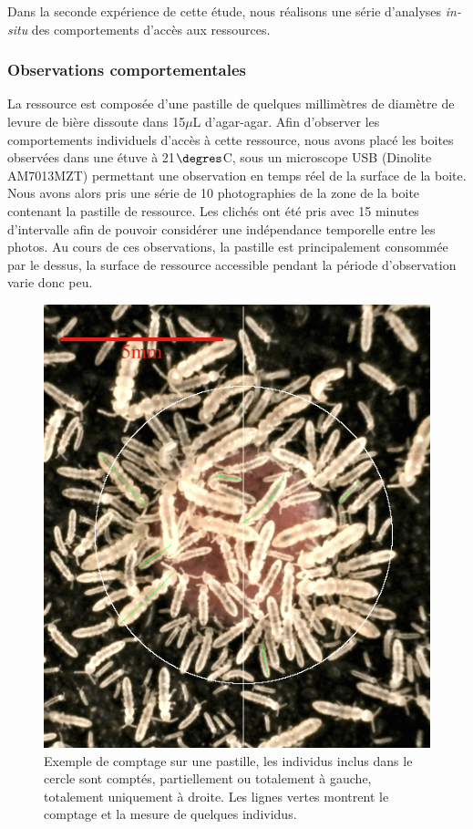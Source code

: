 Dans la seconde expérience de cette étude, nous réalisons une série d'analyses
\textit{in-situ} des comportements d'accès aux ressources.

\subsubsection{Observations comportementales}

La ressource est composée d'une pastille de quelques millimètres de diamètre de
levure de bière dissoute dans 15$\mu$L d'agar-agar. Afin d'observer les
comportements individuels d'accès à cette ressource, nous avons placé les boites
observées dans une étuve à 21$\degres$C, sous un microscope USB (Dinolite
AM7013MZT) permettant une observation en temps réel de la surface de la boite.
Nous avons alors pris une série de 10 photographies de la zone de la boite contenant la pastille de
ressource. Les clichés ont été pris avec 15 minutes d'intervalle afin de pouvoir
considérer une indépendance temporelle entre les photos. Au cours de ces
observations, la pastille est principalement consommée par le dessus, la surface
de ressource accessible pendant la période d'observation varie donc peu.

\begin{figure}[!ht]
\begin{center}
\includegraphics[height=0.25\textheight]{1_CorpsDeThese/Resumes/Fig/SM01b}
\caption[Exemple de comptage
sur une pastille]{Exemple de comptage
sur une pastille, les individus inclus dans le cercle sont comptés,
partiellement ou totalement à gauche, totalement uniquement à droite. Les
lignes vertes montrent le comptage et la mesure de quelques individus.}
\label{fig:SM1b}
\end{center}
\end{figure}

